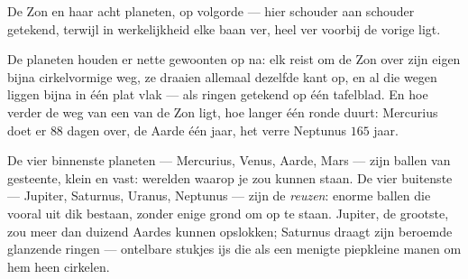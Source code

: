 \begin{omfigure}

{\small De Zon en haar acht planeten, op volgorde --- hier schouder aan
schouder getekend, terwijl in werkelijkheid elke baan ver, heel ver
voorbij de vorige ligt.}
\end{omfigure}

\begin{proposition}\label{prop:g4:solar-system:habits}
De planeten houden er nette gewoonten op na: elk reist om de Zon over
zijn eigen bijna cirkelvormige weg, ze draaien allemaal dezelfde kant
op, en al die wegen liggen bijna in één plat vlak --- als ringen
getekend op één tafelblad. En hoe verder de weg van een  van
de Zon ligt, hoe langer één ronde duurt: Mercurius doet er $88$ dagen
over, de Aarde één jaar, het verre Neptunus $165$ jaar.
\end{proposition}

\begin{example}\label{ex:g4:solar-system:kinds}
De vier binnenste planeten --- Mercurius, Venus, Aarde, Mars --- zijn
ballen van gesteente, klein en vast: werelden waarop je zou kunnen
staan. De vier buitenste --- Jupiter, Saturnus, Uranus, Neptunus ---
zijn de \emph{reuzen}: enorme ballen die vooral uit dik  bestaan,
zonder enige grond om op te staan. Jupiter, de grootste, zou meer dan
duizend Aardes kunnen opslokken; Saturnus draagt zijn beroemde
glanzende ringen --- ontelbare stukjes ijs die als een menigte
piepkleine manen om hem heen cirkelen.
\end{example}

